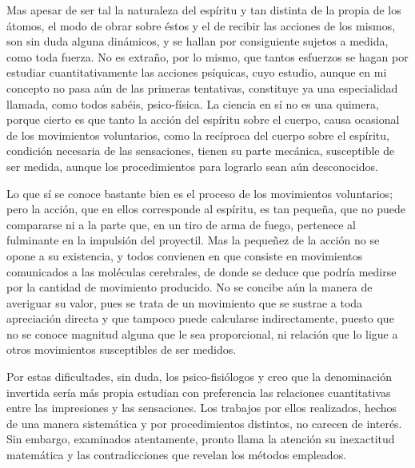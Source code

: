 \documentclass[a4paper, 12pt]{article}
\begin{document}
Mas apesar de ser tal la naturaleza del espíritu y tan distinta de la propia de los átomos, el modo de obrar sobre éstos y el de recibir las acciones de los mismos, son sin duda alguna dinámicos, y se hallan por consiguiente sujetos a medida, como toda fuerza. No es extraño, por lo mismo, que tantos esfuerzos se hagan por estudiar cuantitativamente las acciones psíquicas, cuyo estudio, aunque en mi concepto no pasa aún de las primeras tentativas, constituye ya una especialidad llamada, como todos sabéis, psico-física. La ciencia en sí no es una quimera, porque cierto es que tanto la acción del espíritu sobre el cuerpo, causa ocasional de los movimientos voluntarios, como la recíproca del cuerpo sobre el espíritu, condición necesaria de las sensaciones, tienen su parte mecánica, susceptible de ser medida, aunque los procedimientos para lograrlo sean aún desconocidos.

Lo que sí se conoce bastante bien es el proceso de los movimientos voluntarios; pero la acción, que en ellos corresponde al espíritu, es tan pequeña, que no puede compararse ni a la parte que, en un tiro de arma de fuego, pertenece al fulminante en la impulsión del proyectil. Mas la pequeñez de la acción no se opone a su existencia, y todos convienen en que consiste en movimientos comunicados a las moléculas cerebrales, de donde se deduce que podría medirse por la cantidad de movimiento producido. No se concibe aún la manera de averiguar su valor, pues se trata de un movimiento que se sustrae a toda apreciación directa y que tampoco puede calcularse indirectamente, puesto que no se conoce magnitud alguna que le sea proporcional, ni relación que lo ligue a otros movimientos susceptibles de ser medidos.

Por estas dificultades, sin duda, los psico-fisiólogos y creo que la denominación invertida sería más propia estudian con preferencia las relaciones cuantitativas entre las impresiones y las sensaciones. Los trabajos por ellos realizados, hechos de una manera sistemática y por procedimientos distintos, no carecen de interés. Sin embargo, examinados atentamente, pronto llama la atención su inexactitud matemática y las contradicciones que revelan los métodos empleados.
\end{document}
